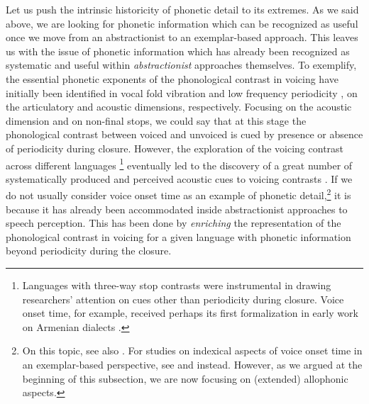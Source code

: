 Let us push the intrinsic historicity of phonetic detail to its extremes. As we said above, we are looking for phonetic information which can be recognized as useful once we move from an abstractionist to an exemplar-based approach. This leaves us with the issue of phonetic information which has already been recognized as systematic and useful within \textit{abstractionist} approaches themselves. To exemplify, the essential phonetic exponents of the phonological contrast in voicing \citep{trubeckoj1939grundzuege} have initially been identified in vocal fold vibration and low frequency periodicity \citep{jakobson1952preliminaries}, on the articulatory and acoustic dimensions, respectively. Focusing on the acoustic dimension and on non-final stops, we could say that at this stage the phonological contrast between voiced and unvoiced is cued by presence or absence of periodicity during closure. However, the exploration of the voicing contrast across different languages \citep{lisker1964crosslanguage}\footnote{Languages with three-way stop contrasts were instrumental in drawing researchers' attention on cues other than periodicity during closure. Voice onset time, for example, received perhaps its first formalization in early work on Armenian dialects \citep{adjarian1899explosives}.} eventually led to the discovery of a great number of systematically produced and perceived acoustic cues to voicing contrasts \citep{lisker1986voicing}. If we do not usually consider voice onset time as an example of phonetic detail,\footnote{On this topic, see also \citet{vanalphen2006effect}. For studies on indexical aspects of voice onset time in an exemplar-based perspective, see \citet{theodore2009characteristics} and \citet{levi2010priming} instead. However, as we argued at the beginning of this subsection, we are now focusing on (extended) allophonic aspects.} it is because it has already been accommodated inside abstractionist approaches to speech perception. This has been done by \textit{enriching} the representation of the phonological contrast in voicing for a given language with phonetic information beyond periodicity during the closure. 

